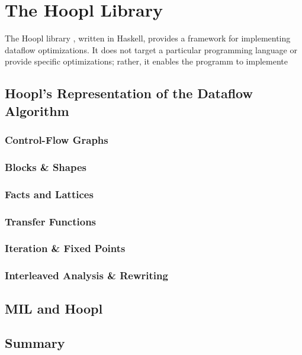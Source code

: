 \documentclass[12pt]{report}
\begin{document}

\chapter{The Hoopl Library}
\label{ref_chapter_hoopl}


The Hoopl library \citep{Hoopl-3.8.7.0}, written in Haskell, provides a
framework for implementing dataflow optimizations. It does not target a 
particular programming language or provide specific optimizations; rather, it
enables the programm to implemente

\section{Hoopl's Representation of the Dataflow Algorithm}

\subsection{Control-Flow Graphs}

\subsection{Blocks \& Shapes}

\subsection{Facts and Lattices}

\subsection{Transfer Functions}

\subsection{Iteration \& Fixed Points}

\subsection{Interleaved Analysis \& Rewriting}

\section{MIL and Hoopl}

\section{Summary}

\standaloneBib
\end{document}
